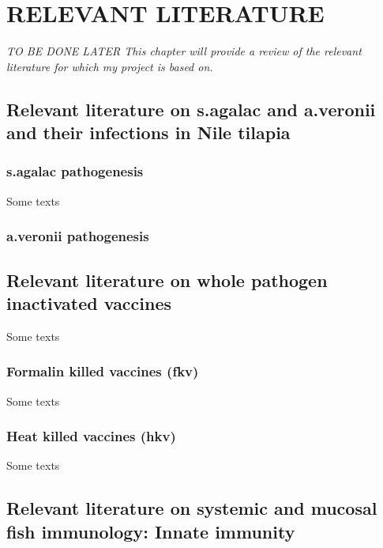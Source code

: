\setlength{\footskip}{8mm}

\chapter{RELEVANT LITERATURE}
\label{ch:literature-review}

\textit{TO BE DONE LATER This chapter will provide a review of the relevant literature for which my project is based on.}

\section{Relevant literature on \ac{s.agalac} and \ac{a.veronii} and their infections in Nile tilapia} 

\subsection{\ac{s.agalac} pathogenesis}
\label{ssec:s-agalac-pathogenesis}

Some texts

\subsection{\ac{a.veronii} pathogenesis}
\label{ssec:a-veronii-pathogenesis}
\section{Relevant literature on whole pathogen inactivated vaccines} 
\label{sec:relevant-literature-on-whole-pathogen-inactivated-vaccines}

Some texts

\subsection{Formalin killed vaccines (\ac{fkv})}
\label{ssec:fkvs}

Some texts

\subsection{Heat killed vaccines (\acs{hkv})}
\label{ssec:hkvs}

Some texts

\newpage

\section{Relevant literature on systemic and mucosal fish immunology: Innate immunity} 
\label{sec:systemic-mucosal-immuno-innate}

